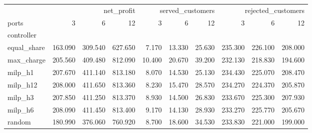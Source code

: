 \begin{tabular}{lrrrrrrrrr}
\toprule
 & \multicolumn{3}{r}{net_profit} & \multicolumn{3}{r}{served_customers} & \multicolumn{3}{r}{rejected_customers} \\
ports & 3 & 6 & 12 & 3 & 6 & 12 & 3 & 6 & 12 \\
controller &  &  &  &  &  &  &  &  &  \\
\midrule
equal_share & 163.090 & 309.540 & 627.650 & 7.170 & 13.330 & 25.630 & 235.300 & 226.100 & 208.000 \\
max_charge & 205.560 & 409.480 & 812.090 & 10.400 & 20.670 & 39.200 & 232.130 & 218.830 & 194.600 \\
milp_h1 & 207.670 & 411.140 & 813.180 & 8.070 & 14.530 & 25.130 & 234.430 & 225.070 & 208.470 \\
milp_h12 & 208.000 & 411.650 & 813.360 & 8.230 & 15.470 & 28.570 & 234.270 & 224.370 & 205.870 \\
milp_h3 & 207.850 & 411.250 & 813.370 & 8.930 & 14.500 & 26.830 & 233.670 & 225.300 & 207.930 \\
milp_h6 & 208.090 & 411.450 & 813.400 & 9.170 & 14.130 & 28.930 & 233.270 & 225.770 & 205.670 \\
random & 180.990 & 376.060 & 760.920 & 8.700 & 18.600 & 34.530 & 233.830 & 221.000 & 199.000 \\
\bottomrule
\end{tabular}
